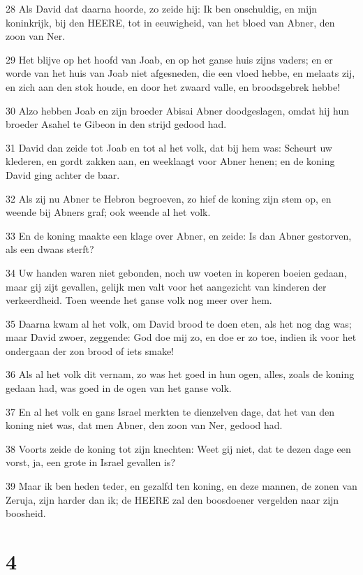 \par 28 Als David dat daarna hoorde, zo zeide hij: Ik ben onschuldig, en mijn koninkrijk, bij den HEERE, tot in eeuwigheid, van het bloed van Abner, den zoon van Ner.
\par 29 Het blijve op het hoofd van Joab, en op het ganse huis zijns vaders; en er worde van het huis van Joab niet afgesneden, die een vloed hebbe, en melaats zij, en zich aan den stok houde, en door het zwaard valle, en broodsgebrek hebbe!
\par 30 Alzo hebben Joab en zijn broeder Abisai Abner doodgeslagen, omdat hij hun broeder Asahel te Gibeon in den strijd gedood had.
\par 31 David dan zeide tot Joab en tot al het volk, dat bij hem was: Scheurt uw klederen, en gordt zakken aan, en weeklaagt voor Abner henen; en de koning David ging achter de baar.
\par 32 Als zij nu Abner te Hebron begroeven, zo hief de koning zijn stem op, en weende bij Abners graf; ook weende al het volk.
\par 33 En de koning maakte een klage over Abner, en zeide: Is dan Abner gestorven, als een dwaas sterft?
\par 34 Uw handen waren niet gebonden, noch uw voeten in koperen boeien gedaan, maar gij zijt gevallen, gelijk men valt voor het aangezicht van kinderen der verkeerdheid. Toen weende het ganse volk nog meer over hem.
\par 35 Daarna kwam al het volk, om David brood te doen eten, als het nog dag was; maar David zwoer, zeggende: God doe mij zo, en doe er zo toe, indien ik voor het ondergaan der zon brood of iets smake!
\par 36 Als al het volk dit vernam, zo was het goed in hun ogen, alles, zoals de koning gedaan had, was goed in de ogen van het ganse volk.
\par 37 En al het volk en gans Israel merkten te dienzelven dage, dat het van den koning niet was, dat men Abner, den zoon van Ner, gedood had.
\par 38 Voorts zeide de koning tot zijn knechten: Weet gij niet, dat te dezen dage een vorst, ja, een grote in Israel gevallen is?
\par 39 Maar ik ben heden teder, en gezalfd ten koning, en deze mannen, de zonen van Zeruja, zijn harder dan ik; de HEERE zal den boosdoener vergelden naar zijn boosheid.

\chapter{4}

